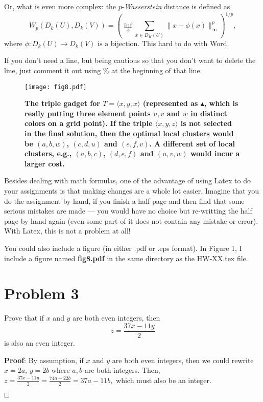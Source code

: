 \documentclass[11pt]{article}
\begin{document}
Or, what is even more complex:
 the $p$-{\em Wasserstein} distance is defined as
$$W_p(D_k(U),D_k(V))=\left( \inf_{\phi}\sum_{x\in D_K(U)}\|x-\phi(x)\|^p_{\infty}\right)^{1/p},$$ 
where $\phi:D_k(U)\rightarrow D_k(V) \mbox{~is~a~bijection}.$
This hard to do with Word.
\newline

If you don't need a line, but being cautious so that you don't want to delete
the line, just comment it out using \% at the beginning of that line.
\newline

\begin{figure}[htbp]
\begin{center}
\texttt{[image: fig8.pdf]}
\end{center}
\label{fig1}
\caption{\bf The triple gadget for $T=\langle x,y,x\rangle$ (represented as $\blacktriangle$, which is really putting three element points $u,v$ and $w$ in distinct colors on a grid point). If the triple $\langle x,y,z\rangle$ is not selected in the final solution, then the optimal local clusters would be $(a,b,w)$, $(c,d,u)$ and $(e,f,v)$. A different set of local clusters, e.g., $(a,b,c)$, $(d,e,f)$ and $(u,v,w)$ would incur a larger cost.}
\end{figure}

Besides dealing with math formulas, one of the advantage of using Latex to do
your assignments is that making changes are a whole lot easier. Imagine that you
do the assignment by hand, if you finish a half page and then find that some
serious mistakes are made --- you would have no choice but re-writting the
half page by hand again (even some part of it does not contain any mistake or error). With Latex, this is not a problem at all!
\newline

You could also include a figure (in either .pdf or .eps format). In Figure 1,
I include a figure named {\bf fig8.pdf} in the same directory as the HW-XX.tex file.

\section*{Problem 3}

Prove that if $x$ and $y$ are both even integers, then
$$z=\frac{37x-11y}{2}$$
is also an even integer.
\newline

\noindent
{\bf Proof}: By assumption, if $x$ and $y$ are both even integers,
then we could rewrite $x=2a$, $y=2b$ where $a,b$ are both integers.
Then,
$z=\frac{37x-11y}{2}=\frac{74a-22b}{2}=37a-11b,$
which must also be an integer.

$\hfill \Box$
\end{document}
